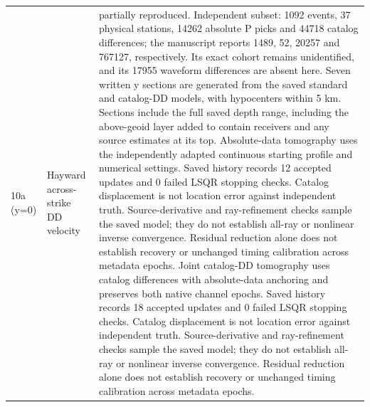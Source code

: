 \begin{longtable}{>{\raggedright\arraybackslash}p{}>{\raggedright\arraybackslash}p{}>{\raggedright\arraybackslash}p{}}
10a (y=0) & Hayward across-strike DD velocity & partially reproduced. Independent subset: 1092 events, 37 physical stations, 14262 absolute P picks and 44718 catalog differences; the manuscript reports 1489, 52, 20257 and 767127, respectively. Its exact cohort remains unidentified, and its 17955 waveform differences are absent here. Seven written y sections are generated from the saved standard and catalog-DD models, with hypocenters within 5 km. Sections include the full saved depth range, including the above-geoid layer added to contain receivers and any source estimates at its top. Absolute-data tomography uses the independently adapted continuous starting profile and numerical settings. Saved history records 12 accepted updates and 0 failed LSQR stopping checks. Catalog displacement is not location error against independent truth. Source-derivative and ray-refinement checks sample the saved model; they do not establish all-ray or nonlinear inverse convergence. Residual reduction alone does not establish recovery or unchanged timing calibration across metadata epochs. Joint catalog-DD tomography uses catalog differences with absolute-data anchoring and preserves both native channel epochs. Saved history records 18 accepted updates and 0 failed LSQR stopping checks. Catalog displacement is not location error against independent truth. Source-derivative and ray-refinement checks sample the saved model; they do not establish all-ray or nonlinear inverse convergence. Residual reduction alone does not establish recovery or unchanged timing calibration across metadata epochs.\\

\end{longtable}
